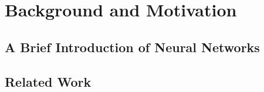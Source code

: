 \chapter{Background and Motivation}\label{background}
\section{A Brief Introduction of Neural Networks}
\section{Related Work}